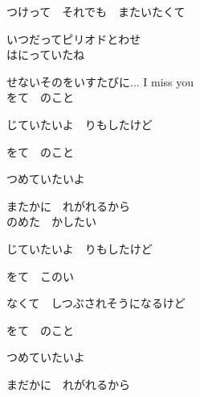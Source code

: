 {つけって　それでも　またいたくて

いつだってピリオドとわせ
\\

はにっていたね

せないそのをいすたびに... I miss you
\\

をて　のこと

じていたいよ　りもしたけど

をて　のこと

つめていたいよ

またかに　れがれるから
\\

のめた　かしたい

じていたいよ　りもしたけど

をて　このい

なくて　しつぶされそうになるけど

をて　のこと

つめていたいよ

まだかに　れがれるから

}